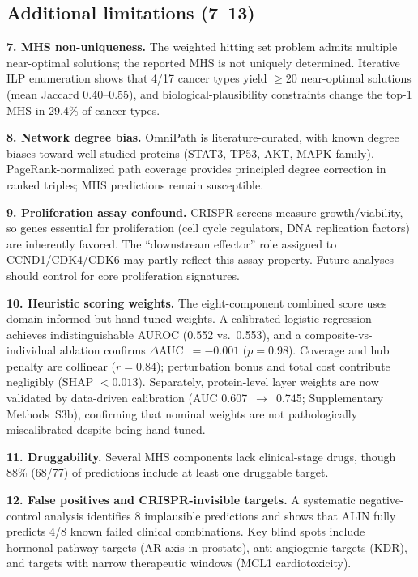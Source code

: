 \documentclass[11pt]{article}
\begin{document}
\subsection{Additional limitations (7--13)}
\label{sec:additional_limitations}

\textbf{7. MHS non-uniqueness.} The weighted hitting set problem admits multiple near-optimal solutions; the reported MHS is not uniquely determined. Iterative ILP enumeration shows that 4/17 cancer types yield $\geq$20 near-optimal solutions (mean Jaccard 0.40--0.55), and biological-plausibility constraints change the top-1 MHS in 29.4\% of cancer types.

\textbf{8. Network degree bias.} OmniPath is literature-curated, with known degree biases toward well-studied proteins (STAT3, TP53, AKT, MAPK family). PageRank-normalized path coverage provides principled degree correction in ranked triples; MHS predictions remain susceptible.

\textbf{9. Proliferation assay confound.} CRISPR screens measure growth/viability, so genes essential for proliferation (cell cycle regulators, DNA replication factors) are inherently favored. The ``downstream effector'' role assigned to CCND1/CDK4/CDK6 may partly reflect this assay property. Future analyses should control for core proliferation signatures.

\textbf{10. Heuristic scoring weights.} The eight-component combined score uses domain-informed but hand-tuned weights. A calibrated logistic regression achieves indistinguishable AUROC (0.552 vs.\ 0.553), and a composite-vs-individual ablation confirms $\Delta$AUC~$= -0.001$ ($p = 0.98$). Coverage and hub penalty are collinear ($r = 0.84$); perturbation bonus and total cost contribute negligibly (SHAP $< 0.013$). Separately, protein-level layer weights are now validated by data-driven calibration (AUC 0.607~$\to$~0.745; Supplementary Methods~S3b), confirming that nominal weights are not pathologically miscalibrated despite being hand-tuned.

\textbf{11. Druggability.} Several MHS components lack clinical-stage drugs, though 88\% (68/77) of predictions include at least one druggable target.

\textbf{12. False positives and CRISPR-invisible targets.} A systematic negative-control analysis identifies 8 implausible predictions and shows that ALIN fully predicts 4/8 known failed clinical combinations. Key blind spots include hormonal pathway targets (AR axis in prostate), anti-angiogenic targets (KDR), and targets with narrow therapeutic windows (MCL1 cardiotoxicity).
\end{document}
